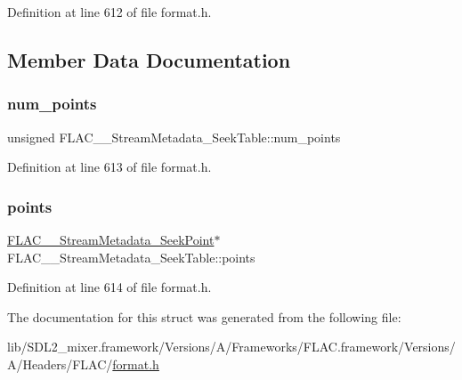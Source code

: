Definition at line 612 of file format.\+h.



\subsection{Member Data Documentation}
\mbox{\label{struct_f_l_a_c_____stream_metadata___seek_table_a12dcdb596297c199fe6cffa27a64e69f}} 
\subsubsection{\texorpdfstring{num\_points}{num\_points}}
{\footnotesize\ttfamily unsigned F\+L\+A\+C\+\_\+\+\_\+\+Stream\+Metadata\+\_\+\+Seek\+Table\+::num\+\_\+points}



Definition at line 613 of file format.\+h.

\mbox{\label{struct_f_l_a_c_____stream_metadata___seek_table_a0bf04ada03ea708dba9d31cd6c6159b8}} 
\subsubsection{\texorpdfstring{points}{points}}
{\footnotesize\ttfamily \mbox{\hyperlink{struct_f_l_a_c_____stream_metadata___seek_point}{F\+L\+A\+C\+\_\+\+\_\+\+Stream\+Metadata\+\_\+\+Seek\+Point}}$\ast$ F\+L\+A\+C\+\_\+\+\_\+\+Stream\+Metadata\+\_\+\+Seek\+Table\+::points}



Definition at line 614 of file format.\+h.



The documentation for this struct was generated from the following file\+:\begin{DoxyCompactItemize}
\item 
lib/\+S\+D\+L2\+\_\+mixer.\+framework/\+Versions/\+A/\+Frameworks/\+F\+L\+A\+C.\+framework/\+Versions/\+A/\+Headers/\+F\+L\+A\+C/\mbox{\hyperlink{format_8h}{format.\+h}}\end{DoxyCompactItemize}
